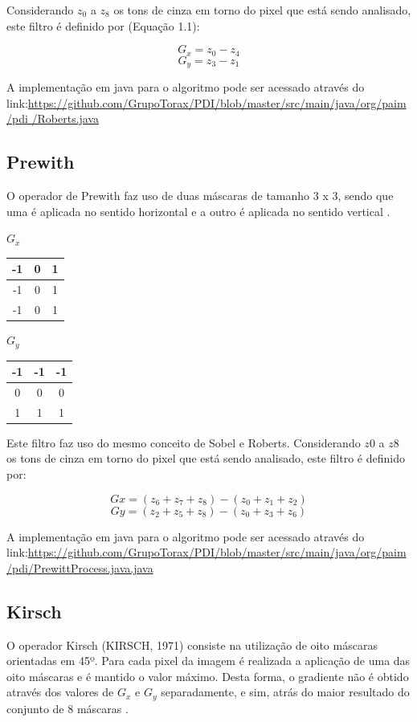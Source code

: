 \documentclass[
	12pt,				%
	oneside,			%
	a4paper,			%
	english,			%
	french,				%
	spanish,			%
	brazil,				%
	]{abntex2}
\begin{document}
Considerando \(z_0\) a \(z_8\) os tons de cinza em torno do pixel que está sendo analisado, este filtro é definido por (Equação 1.1):

\[G_x = z_0 - z_4\]
\[G_y = z_3 -z_1\]

A implementação em java para o algoritmo pode ser acessado através do link:\url{https://github.com/GrupoTorax/PDI/blob/master/src/main/java/org/paim/pdi
/Roberts.java}
\subsection{Prewith}

O operador de Prewith faz uso de duas máscaras de tamanho 3 x 3, sendo que uma é aplicada no sentido horizontal e a outro é aplicada no sentido vertical \cite{pedriniSchwartz:2008}.	

\(G_x\)
\begin{tabular}{|c|c|c|}
	\hline
    -1 & 0 & 1   \\ \hline
	-1 & 0 & 1   \\ \hline   
	-1 & 0 & 1   \\ \hline   
\end{tabular}
\(G_y\)
\begin{tabular}{|c|c|c|}
    \hline
    -1 & -1 & -1   \\ \hline
	 0 &  0 &  0   \\ \hline   
	 1 &  1 &  1   \\ \hline   
\end{tabular}

Este filtro faz uso do mesmo conceito de Sobel e Roberts. Considerando \(z0\) a \(z8\) os tons de cinza em torno do pixel que está sendo analisado, este filtro é definido por:

\[Gx = (z_6 + z_7 + z_8) - (z_0 + z_1 + z_2)\]
\[Gy = (z_2 + z_5 + z_8) - (z_0 + z_3 + z_6)\]

A implementação em java para o algoritmo pode ser acessado através do link:\url{https://github.com/GrupoTorax/PDI/blob/master/src/main/java/org/paim/pdi/PrewittProcess.java.java} 

\subsection{Kirsch}
O operador Kirsch (KIRSCH, 1971) consiste na utilização de oito máscaras orientadas em 45º. Para cada pixel da imagem é realizada a aplicação de uma das oito máscaras e é mantido o valor máximo. Desta forma, o gradiente não é obtido através dos valores de \(G_x\) e \(G_y\) separadamente, e sim, atrás do maior resultado do conjunto de 8 máscaras \cite{pedriniSchwartz:2008}.
\end{document}
